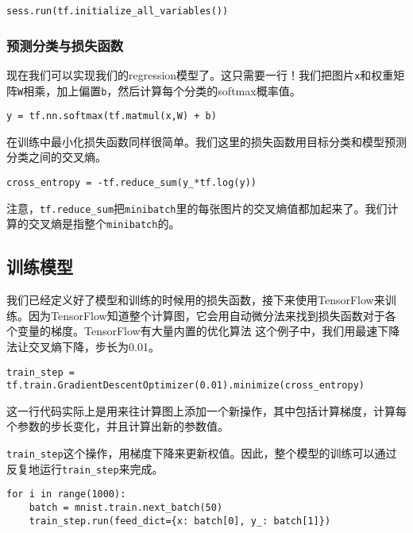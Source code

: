 \begin{lstlisting}
sess.run(tf.initialize_all_variables())
\end{lstlisting}

\subsubsection{预测分类与损失函数}
现在我们可以实现我们的regression模型了。这只需要一行！我们把图片\lstinline{x}和权重矩阵\lstinline{W}相乘，加上偏置\lstinline{b}，然后计算每个分类的softmax概率值。

\begin{lstlisting}
y = tf.nn.softmax(tf.matmul(x,W) + b)
\end{lstlisting}

在训练中最小化损失函数同样很简单。我们这里的损失函数用目标分类和模型预测分类之间的交叉熵。

\begin{lstlisting}
cross_entropy = -tf.reduce_sum(y_*tf.log(y))
\end{lstlisting}

注意，\lstinline{tf.reduce_sum}把\lstinline{minibatch}里的每张图片的交叉熵值都加起来了。我们计算的交叉熵是指整个\lstinline{minibatch}的。

\subsection{训练模型}

我们已经定义好了模型和训练的时候用的损失函数，接下来使用TensorFlow来训练。因为TensorFlow知道整个计算图，它会用自动微分法来找到损失函数对于各个变量的梯度。TensorFlow有大量内置的优化算法 这个例子中，我们用最速下降法让交叉熵下降，步长为0.01。

\begin{lstlisting}
train_step = tf.train.GradientDescentOptimizer(0.01).minimize(cross_entropy)
\end{lstlisting}

这一行代码实际上是用来往计算图上添加一个新操作，其中包括计算梯度，计算每个参数的步长变化，并且计算出新的参数值。

\lstinline{train_step}这个操作，用梯度下降来更新权值。因此，整个模型的训练可以通过反复地运行\lstinline{train_step}来完成。

\begin{lstlisting}
for i in range(1000):
    batch = mnist.train.next_batch(50)
    train_step.run(feed_dict={x: batch[0], y_: batch[1]})
\end{lstlisting}

